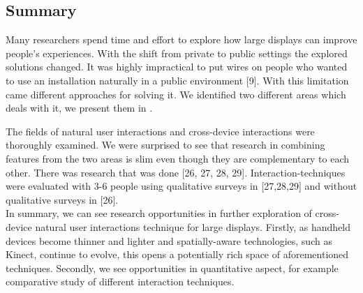 \subsection{Summary}
Many researchers spend time and effort to explore how large displays can improve people's experiences. 
With the shift from private to public settings the explored solutions changed. 
It was highly impractical to put wires on people who wanted to use an installation naturally in a public environment [9].
With this limitation came different approaches for solving it. 
We identified two different areas which deals with it, we present them in .

\begin{figure}[h!]
\centering
{}
\caption{}
\label{fig:litreview}
\end{figure}

 
The fields of natural user interactions and cross-device interactions were thoroughly examined. 
We were surprised to see that research in combining features from the two areas is slim even though they are complementary to each other. 
There was research that was done [26, 27, 28, 29]. 
Interaction-techniques were evaluated with 3-6 people using qualitative surveys in [27,28,29] and without qualitative surveys in [26].\\

In summary, we can see research opportunities in further exploration of cross-device natural user interactions technique for large displays. 
Firstly, as handheld devices become thinner and lighter and spatially-aware technologies, such as Kinect, continue to evolve, this opens a potentially rich space of aforementioned techniques. 
Secondly, we see opportunities in quantitative aspect, for example comparative study of different interaction techniques. 
